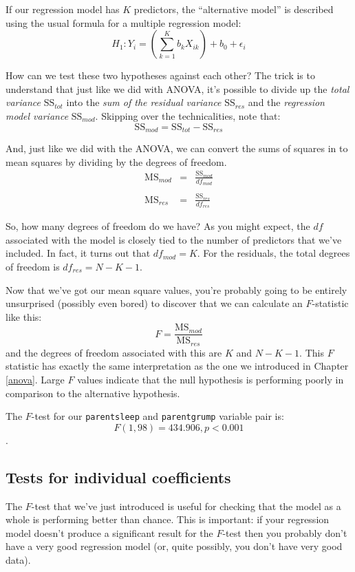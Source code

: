 \documentclass[
  11pt,
  a4paper,
  twoside,symmetric,openright]{book}
\theoremstyle{break}
\theoremstyle{break}
\begin{document}
If our regression model has \(K\) predictors, the ``alternative model'' is described using the usual formula for a multiple regression model:
\[
H_1: Y_i = \left( \sum_{k=1}^K b_{k} X_{ik} \right) + b_0 + \epsilon_i
\]

How can we test these two hypotheses against each other? The trick is to understand that just like we did with ANOVA, it's possible to divide up the \emph{total variance} \(\mbox{SS}_ {tot}\) into the \emph{sum of the residual variance} \(\mbox{SS}_ {res}\) and the \emph{regression model variance} \(\mbox{SS}_ {mod}\). Skipping over the technicalities, note that:
\[
\mbox{SS}_{mod} = \mbox{SS}_{tot} - \mbox{SS}_{res}
\]

And, just like we did with the ANOVA, we can convert the sums of squares in to mean squares by dividing by the degrees of freedom.
\[
\begin{array}{rcl}
\mbox{MS}_{mod} &=& \displaystyle\frac{\mbox{SS}_{mod} }{df_{mod}} \\ \\
\mbox{MS}_{res} &=& \displaystyle\frac{\mbox{SS}_{res} }{df_{res} }
\end{array}
\]

So, how many degrees of freedom do we have? As you might expect, the \(df\) associated with the model is closely tied to the number of predictors that we've included. In fact, it turns out that \(df_{mod} = K\). For the residuals, the total degrees of freedom is \(df_{res} = N - K - 1\).

Now that we've got our mean square values, you're probably going to be entirely unsurprised (possibly even bored) to discover that we can calculate an \(F\)-statistic like this:
\[
F =  \frac{\mbox{MS}_{mod}}{\mbox{MS}_{res}}
\]
and the degrees of freedom associated with this are \(K\) and \(N-K-1\). This \(F\) statistic has exactly the same interpretation as the one we introduced in Chapter \ref{anova}. Large \(F\) values indicate that the null hypothesis is performing poorly in comparison to the alternative hypothesis.

The \(F\)-test for our \texttt{parentsleep} and \texttt{parentgrump} variable pair is:
\[
F(1, 98) = 434.906, p < 0.001
\].

\subsection{Tests for individual coefficients}\label{tests-for-individual-coefficients}

The \(F\)-test that we've just introduced is useful for checking that the model as a whole is performing better than chance. This is important: if your regression model doesn't produce a significant result for the \(F\)-test then you probably don't have a very good regression model (or, quite possibly, you don't have very good data).
\end{document}
